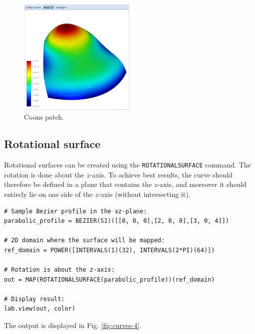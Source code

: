 \documentclass[article,A4,12pt]{llncs}
\begin{document}
\begin{figure}[!ht]
\begin{center}
\includegraphics[width=0.5\textwidth]{img/curves-3.png}
\end{center}
\vspace{-2mm}
\caption{Coons patch.}
\label{fig:curves-3}
\end{figure}

\subsection{Rotational surface}

Rotational surfaces can be created using the {\tt ROTATIONALSURFACE} command.
The rotation is done about the $z$-axis. To achieve best results, the curve
should therefore be defined in a plane that contains the $z$-axis, and moreover 
it should entirely lie on one side of the $z$-axis (without intersecting it).

\begin{verbatim}
# Sample Bezier profile in the xz-plane: 
parabolic_profile = BEZIER(S1)([[0, 0, 0],[2, 0, 0],[3, 0, 4]])
  
# 2D domain where the surface will be mapped:
ref_domain = POWER([INTERVALS(1)(32), INTERVALS(2*PI)(64)])

# Rotation is about the z-axis:
out = MAP(ROTATIONALSURFACE(parabolic_profile))(ref_domain)
 
# Display result:
lab.view(out, color)
\end{verbatim}
The output is displayed in Fig. \ref{fig:curves-4}.
\end{document}
